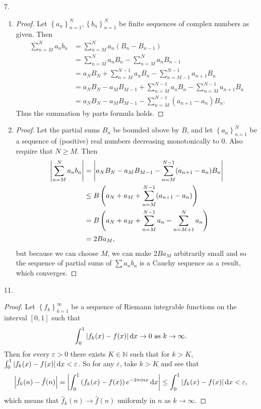 \documentclass[11pt]{article}
\newcommand{\br}[1]{\left(#1\right)}
\newcommand{\cbr}[1]{\left\{#1\right\}}
\begin{document}
7. \begin{enumerate}[label=(\alph*)]
    \item \begin{proof}
        Let $\cbr{a_n}_{n=1}^N, \cbr{b_n}_{n=1}^N$ be finite sequences of complex numbers as given. Then \begin{align*}
            \sum_{n=M}^N a_nb_n &= \sum_{n=M}^N a_n(B_n - B_{n-1}) \\
            &= \sum_{n=M}^N a_nB_n - \sum_{n=M}^N a_nB_{n-1} \\
            &= a_NB_N + \sum_{n=M}^{N-1} a_nB_n - \sum_{n=M-1}^{N-1} a_{n+1}B_{n} \\
            &= a_NB_N - a_MB_{M-1} + \sum_{n=M}^{N-1} a_nB_n - \sum_{n=M}^{N-1} a_{n+1}B_{n} \\
            &= a_NB_N - a_MB_{M-1} - \sum_{n=M}^{N-1} (a_{n+1} - a_n)B_n.
        \end{align*} Thus the summation by parts formula holds.
    \end{proof}
    \item \begin{proof}
        Let the partial sums $B_n$ be bounded above by $B$, and let $\cbr{a_n}_{n=1}^{N}$ be a sequence of (positive) real numbers decreasing monotonically to $0$. Also require that $N\geq M$. Then \begin{align*}\abs{\sum_{n=M}^N a_nb_n} &= \abs{a_NB_N - a_MB_{M-1} - \sum_{n=M}^{N-1} (a_{n+1} - a_n)B_n} \\
        &\leq B\br{a_N+a_M+\sum_{n=M}^{N-1}(a_{n+1} - a_n)} \\
        &= B\br{a_N+a_M+\sum_{n=M}^{N-1} a_n - \sum_{n=M+1}^{N} a_{n}} \\
        &= 2Ba_M, \end{align*} but because we can choose $M$, we can make $2Ba_M$ arbitrarily small and so the sequence of partial sums of $\sum a_nb_n$ is a Cauchy sequence as a result, which converges.
    \end{proof}
\end{enumerate}

11. \begin{proof}
    Let $\cbr{f_k}_{k=1}^{\infty}$ be a sequence of Riemann integrable functions on the interval $[0,1]$ such that \[\int_0^1 \abs{f_k(x)-f(x)}\dd{x} \to 0\text{ as } k\to \infty.\] Then for every $\varepsilon > 0$ there exists $K\in \mathbb{N}$ such that for $k>K$, $\int_0^1 \abs{f_k(x)-f(x)}\dd{x} < \varepsilon$. So for any $\varepsilon$, take $k> K$ and see that \[\abs{\hat{f}_k(n) - \hat{f}(n)} = \abs{\int_0^1\br{f_k(x)-f(x)}e^{-2\pi inx}\dd{x}}\leq \int_0^1\abs{f_k(x)-f(x)}\dd{x} < \varepsilon,\] which means that $\hat{f}_k(n)\to \hat{f}(n)$ uniformly in $n$ as $k\to \infty$.
\end{proof}
\end{document}
